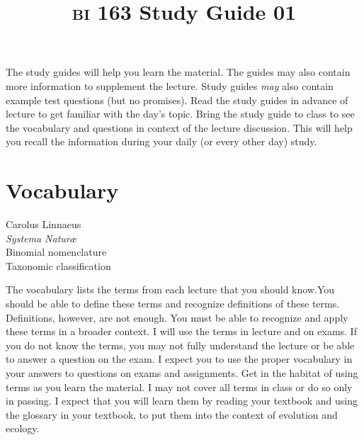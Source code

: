 \documentclass[letterpaper]{tufte-handout}
\title{{\scshape bi} 163 Study Guide 01\hfill}
\date{} %
\begin{document}
\maketitle	%



The study guides will help you learn the material. The guides may also contain more information to supplement the lecture. Study guides \emph{may} also contain example test questions (but no promises).  Read the study guides in advance of lecture to get familiar with the day's topic. Bring the study guide to class to see the vocabulary and questions in context of the lecture discussion. This will help you recall the information during your daily (or every other day) study.

\section{Vocabulary} 

\vspace{-1\baselineskip}
\begin{multicols}{2}
Carolus Linnaeus\\
\textit{Systema Natur\ae}\\
Binomial nomenclature\\
Taxonomic classification
\end{multicols}

The vocabulary lists the terms from each lecture that you should know.You should be able to define these terms and recognize definitions of these terms. Definitions, however, are not enough. You must be able to recognize and apply these terms in a broader context.  I will use the terms in lecture and on exams. If you do not know the terms, you may not fully understand the lecture or be able to answer a question on the exam. I expect you to use the proper vocabulary in your answers to questions on exams and assignments.  Get in the habitat of using terms as you learn the material.  I may not cover all terms in class or do so only in passing.  I expect that you will learn them by reading your textbook and using the glossary in your textbook, to put them into the context of evolution and ecology.
\end{document}
